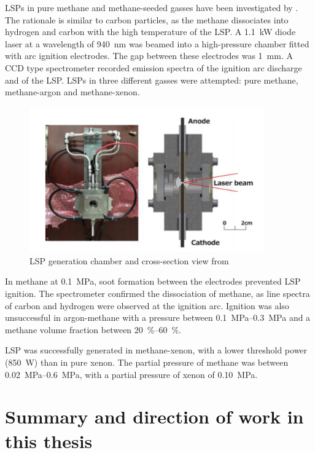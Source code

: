         LSPs in pure methane and methane-seeded gasses have been investigated by \textcite{kameiMethaneMethaneXenon2020}. The rationale is similar to carbon particles, as the methane dissociates into hydrogen and carbon with the high temperature of the LSP. A \qty{1.1}{kW} diode laser at a wavelength of \qty{940}{nm} was beamed into a high-pressure chamber fitted with arc ignition electrodes. The gap between these electrodes was \qty{1}{mm}. A CCD type spectrometer recorded emission spectra of the ignition arc discharge and of the LSP. LSPs in three different gasses were attempted: pure methane, methane-argon and methane-xenon.
        \begin{figure}[h!]
            \centering
            \includegraphics[width=0.9\textwidth]{assets/2 background/Kamei apparatus.png}
            \caption{LSP generation chamber and cross-section view from \textcite{kameiMethaneMethaneXenon2020}}
            \label{fig:Kamei}
        \end{figure}
        In methane at \qty{0.1}{MPa}, soot formation between the electrodes prevented LSP ignition. The spectrometer confirmed the dissociation of methane, as line spectra of carbon and hydrogen were observed at the ignition arc. Ignition was also unsuccessful in argon-methane with a pressure between \qtyrange{0.1}{0.3}{MPa} and a methane volume fraction between \qtyrange{20}{60}{\%}. 
        
        LSP was successfully generated in methane-xenon, with a lower threshold power (\qty{850}{W}) than in pure xenon. The partial pressure of methane was between \qtyrange{0.02}{0.6}{MPa}, with a partial pressure of xenon of \qty{0.10}{MPa}.

    \section{Summary and direction of work in this thesis}
        
